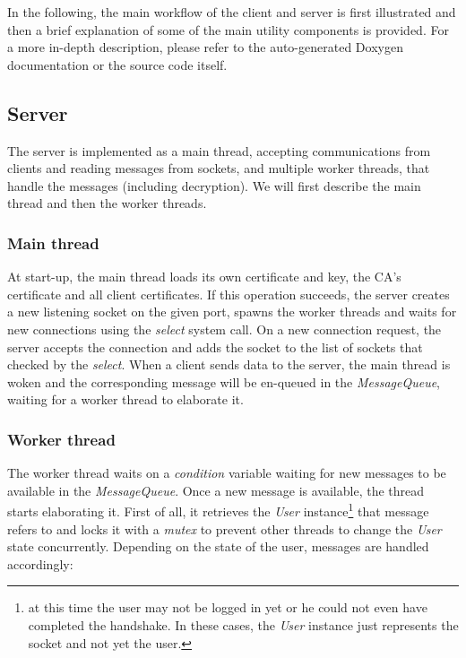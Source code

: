 In the following, the main workflow of the client and server is first
illustrated and then a brief explanation of some of the main utility components 
is provided. For a more in-depth description, please refer to the auto-generated 
Doxygen documentation or the source code itself.

\subsection{Server}
The server is implemented as a main thread, accepting communications from 
clients and reading messages from sockets, and multiple worker threads, that 
handle the messages (including decryption). We will first describe the main 
thread and then the worker threads.

\subsubsection{Main thread}
At start-up, the main thread loads its own certificate and key, the CA's 
certificate and all client certificates. If this operation succeeds, the 
server creates a new listening socket on the given port, spawns the worker 
threads and waits for new connections using the \emph{select} system call.
On a new connection request, the server accepts the connection and adds the 
socket to the list of sockets that checked by the \emph{select}. When a client
sends data to the server, the main thread is woken and the corresponding 
message will be en-queued in the \emph{MessageQueue}, waiting for a worker
thread to elaborate it.

\subsubsection{Worker thread}
The worker thread waits on a \emph{condition} variable waiting for new messages
to be available in the \emph{MessageQueue}. Once a new message is available,
the thread starts elaborating it. First of all, it retrieves the \emph{User}
instance\footnote{at this time the user may not be logged in yet or he could 
not even have completed the handshake. In these cases, the \emph{User} instance
just represents the socket and not yet the user.} that message refers to and 
locks it with a \emph{mutex} to prevent other threads to change the \emph{User} 
state concurrently. Depending on the state of the user, messages are handled
accordingly:

